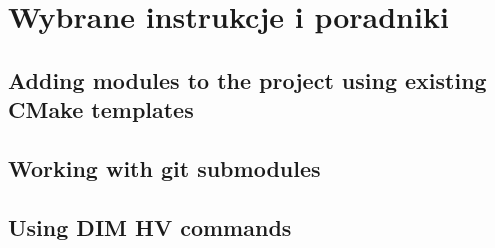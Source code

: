 \chapter{Wybrane instrukcje i poradniki} %
\label{cha:howtos}


\section{Adding modules to the project using existing CMake templates}
\section{Working with git submodules}
\section{Using DIM HV commands}